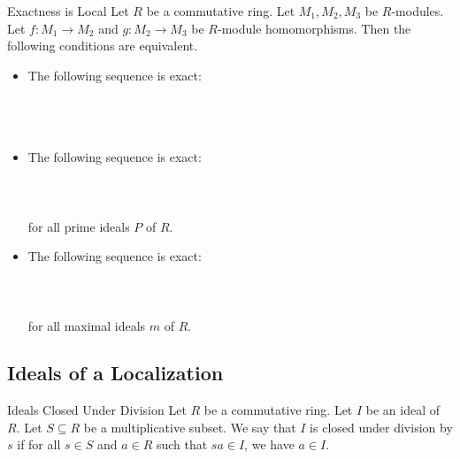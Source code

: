 \documentclass[a4paper]{article}
\begin{document}
\begin{prp}{Exactness is Local}{} Let $R$ be a commutative ring. Let $M_1,M_2,M_3$ be $R$-modules. Let $f:M_1\to M_2$ and $g:M_2\to M_3$ be $R$-module homomorphisms. Then the following conditions are equivalent. 
\begin{itemize}
\item The following sequence is exact: \\~\\
\\~\\
\item The following sequence is exact: \\~\\
\\~\\
for all prime ideals $P$ of $R$. 
\item The following sequence is exact: \\~\\
\\~\\
for all maximal ideals $m$ of $R$. 
\end{itemize}
\end{prp}

\subsection{Ideals of a Localization}
\begin{defn}{Ideals Closed Under Division}{} Let $R$ be a commutative ring. Let $I$ be an ideal of $R$. Let $S\subseteq R$ be a multiplicative subset. We say that $I$ is closed under division by $s$ if for all $s\in S$ and $a\in R$ such that $sa\in I$, we have $a\in I$. 
\end{defn}
\end{document}
